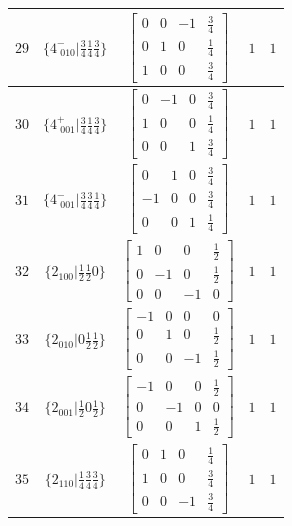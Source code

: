 \documentclass[fleqn,8pt]{jsarticle}
\begin{document}
\begin{longtable}{ccccc}
$ 29 $ & $ \{4^{-}_{\,\,010}|\frac{3}{4} \frac{1}{4} \frac{3}{4}\} $ & $ \begin{bmatrix} 0 & 0 & -1 & \frac{3}{4} \\ 0 & 1 & 0 & \frac{1}{4} \\ 1 & 0 & 0 & \frac{3}{4} \end{bmatrix} $ & $ 1 $ & $ 1 $ \\ \hline
$ 30 $ & $ \{4^{+}_{\,\,001}|\frac{3}{4} \frac{1}{4} \frac{3}{4}\} $ & $ \begin{bmatrix} 0 & -1 & 0 & \frac{3}{4} \\ 1 & 0 & 0 & \frac{1}{4} \\ 0 & 0 & 1 & \frac{3}{4} \end{bmatrix} $ & $ 1 $ & $ 1 $ \\ \hline
$ 31 $ & $ \{4^{-}_{\,\,001}|\frac{3}{4} \frac{3}{4} \frac{1}{4}\} $ & $ \begin{bmatrix} 0 & 1 & 0 & \frac{3}{4} \\ -1 & 0 & 0 & \frac{3}{4} \\ 0 & 0 & 1 & \frac{1}{4} \end{bmatrix} $ & $ 1 $ & $ 1 $ \\ \hline
$ 32 $ & $ \{2{}_{100}|\frac{1}{2} \frac{1}{2} 0\} $ & $ \begin{bmatrix} 1 & 0 & 0 & \frac{1}{2} \\ 0 & -1 & 0 & \frac{1}{2} \\ 0 & 0 & -1 & 0 \end{bmatrix} $ & $ 1 $ & $ 1 $ \\ \hline
$ 33 $ & $ \{2{}_{010}|0 \frac{1}{2} \frac{1}{2}\} $ & $ \begin{bmatrix} -1 & 0 & 0 & 0 \\ 0 & 1 & 0 & \frac{1}{2} \\ 0 & 0 & -1 & \frac{1}{2} \end{bmatrix} $ & $ 1 $ & $ 1 $ \\ \hline
$ 34 $ & $ \{2{}_{001}|\frac{1}{2} 0 \frac{1}{2}\} $ & $ \begin{bmatrix} -1 & 0 & 0 & \frac{1}{2} \\ 0 & -1 & 0 & 0 \\ 0 & 0 & 1 & \frac{1}{2} \end{bmatrix} $ & $ 1 $ & $ 1 $ \\ \hline
$ 35 $ & $ \{2{}_{110}|\frac{1}{4} \frac{3}{4} \frac{3}{4}\} $ & $ \begin{bmatrix} 0 & 1 & 0 & \frac{1}{4} \\ 1 & 0 & 0 & \frac{3}{4} \\ 0 & 0 & -1 & \frac{3}{4} \end{bmatrix} $ & $ 1 $ & $ 1 $ \\ \hline

\end{longtable}
\end{document}
